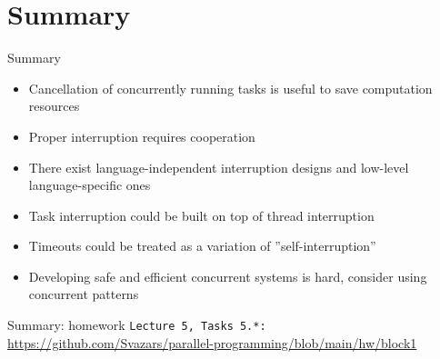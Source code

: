%
%
%

\section{Summary}

\begin{frame}{Summary}

\begin{itemize}
    \item Cancellation of concurrently running tasks is useful to save computation resources
    \item Proper interruption requires cooperation
    \item There exist language-independent interruption designs and low-level language-specific ones
    \item Task interruption could be built on top of thread interruption
    \item Timeouts could be treated as a variation of ''self-interruption''
    \item Developing safe and efficient concurrent systems is hard, consider using concurrent patterns    
\end{itemize}
\end{frame}

\begin{frame}{Summary: homework}
    \texttt{Lecture 5, Tasks 5.*:} {\tiny\url{https://github.com/Svazars/parallel-programming/blob/main/hw/block1}}
\end{frame}


